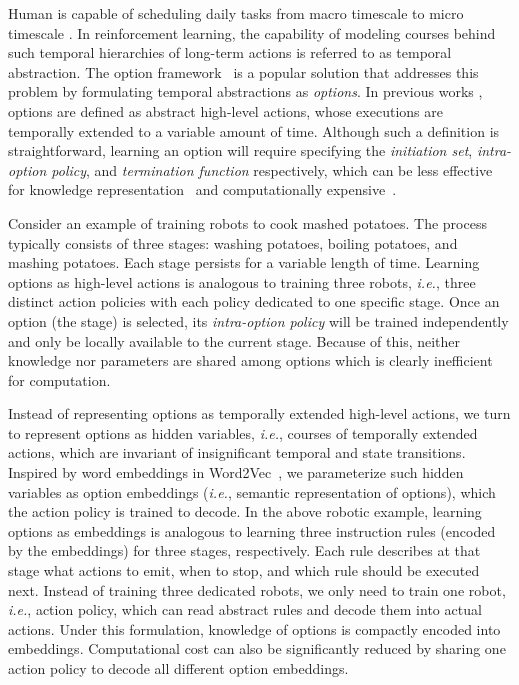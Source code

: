 \documentclass{article}
\begin{document}
Human is capable of scheduling daily tasks from macro timescale
to micro timescale \cite{xia2020temporal}. In reinforcement
learning, the capability of modeling courses behind such temporal
hierarchies of long-term actions is referred to as temporal
abstraction. The option framework~\cite{sutton1999between} is a
popular solution that addresses this problem by formulating
temporal abstractions as \emph{options}. In previous works
\cite{sutton1999between,zhang2019dac,klissarov2017learnings,daniel2016probabilistic,levy2011unified,bacon2017option},
options are defined as abstract high-level actions, whose
executions are temporally extended to a variable amount of time.
Although such a definition is straightforward, learning an option
will require specifying the \emph{initiation set}, \emph{intra-option policy},
and \emph{termination function} respectively, which can be less
effective for knowledge representation~\cite{bacon2018temporal}
and computationally
expensive~\cite{jong2008utility,zhang2019dac,mankowitz2016adaptive}.

Consider an example of training robots to cook mashed potatoes.
The process typically consists of three stages: washing potatoes,
boiling potatoes, and mashing potatoes. Each stage persists for a
variable length of time. Learning options as high-level actions
is analogous to training three robots, \textit{i.e.}, three
distinct action policies with each policy dedicated to one
specific stage. Once an option (the stage) is selected, its
\emph{intra-option policy} will be trained independently and only be locally
available to the current stage. Because of this, neither
knowledge nor parameters are shared among options which is
clearly inefficient for computation.

Instead of representing options as temporally extended high-level
actions, we turn to represent options as hidden
variables, \textit{i.e.}, courses of temporally extended actions,
which are invariant of insignificant temporal and state transitions. 
Inspired by word embeddings in Word2Vec~\cite{mikolov2013distributed}, 
we parameterize such hidden variables as option embeddings (\textit{i.e.}, semantic representation of
options), which the action policy is trained to decode. In the above robotic example, learning
options as embeddings is analogous to learning three instruction
rules (encoded by the embeddings) for three stages, respectively.
Each rule describes at that stage what actions to emit, when to
stop, and which rule should be executed next. Instead of training
three dedicated robots, we only need to train one robot,
\textit{i.e.}, action policy, which can read abstract rules and
decode them into actual actions. Under this formulation,
knowledge of options is compactly encoded into embeddings.
Computational cost can also be significantly reduced by sharing
one action policy to decode all different option embeddings.
\end{document}
